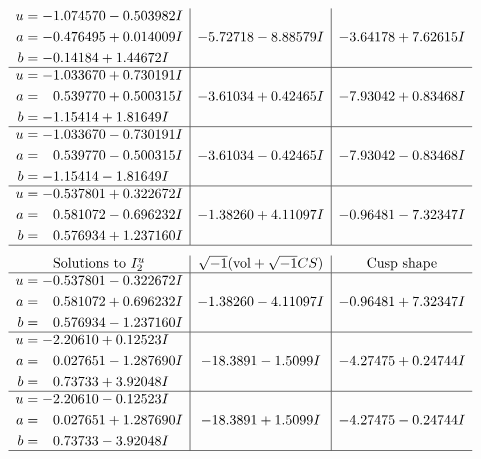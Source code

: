 \documentclass[1p]{elsarticle_modified}
\theoremstyle{definition}
\newcommand{\I}{\sqrt{-1}}
\begin{document}
$$\begin{array}{c|c|c}
\begin{aligned}
u &= -1.074570 - 0.503982 I \\
a &= -0.476495 + 0.014009 I \\
b &= -0.14184 + 1.44672 I\end{aligned}
 & -5.72718 - 8.88579 I & -3.64178 + 7.62615 I \\ \hline\begin{aligned}
u &= -1.033670 + 0.730191 I \\
a &= \phantom{-}0.539770 + 0.500315 I \\
b &= -1.15414 + 1.81649 I\end{aligned}
 & -3.61034 + 0.42465 I & -7.93042 + 0.83468 I \\ \hline\begin{aligned}
u &= -1.033670 - 0.730191 I \\
a &= \phantom{-}0.539770 - 0.500315 I \\
b &= -1.15414 - 1.81649 I\end{aligned}
 & -3.61034 - 0.42465 I & -7.93042 - 0.83468 I \\ \hline\begin{aligned}
u &= -0.537801 + 0.322672 I \\
a &= \phantom{-}0.581072 - 0.696232 I \\
b &= \phantom{-}0.576934 + 1.237160 I\end{aligned}
 & -1.38260 + 4.11097 I & -0.96481 - 7.32347 I\\
 \hline 
 \end{array}$$\newpage$$\begin{array}{c|c|c}  
\text{Solutions to }I^u_{2}& \I (\text{vol} + \sqrt{-1}CS) & \text{Cusp shape}\\
 \hline 
\begin{aligned}
u &= -0.537801 - 0.322672 I \\
a &= \phantom{-}0.581072 + 0.696232 I \\
b &= \phantom{-}0.576934 - 1.237160 I\end{aligned}
 & -1.38260 - 4.11097 I & -0.96481 + 7.32347 I \\ \hline\begin{aligned}
u &= -2.20610 + 0.12523 I \\
a &= \phantom{-}0.027651 - 1.287690 I \\
b &= \phantom{-}0.73733 + 3.92048 I\end{aligned}
 & -18.3891 - 1.5099 I & -4.27475 + 0.24744 I \\ \hline\begin{aligned}
u &= -2.20610 - 0.12523 I \\
a &= \phantom{-}0.027651 + 1.287690 I \\
b &= \phantom{-}0.73733 - 3.92048 I\end{aligned}
 & -18.3891 + 1.5099 I & -4.27475 - 0.24744 I\\
 \hline 
 \end{array}$$\newpage\newpage\renewcommand{\arraystretch}{1}
\end{document}
